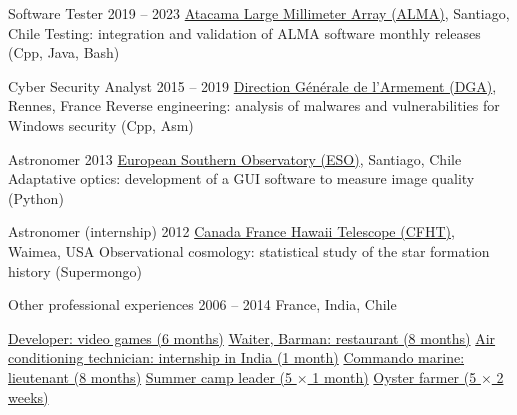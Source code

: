 \begin{joblist}[\tbfwidth][8.4][\tbfyeary]

\setlength{\parskip}{0.3cm}
\vspace{-0.4cm}

\item[Software Tester]{2019 -- 2023}
  {
  \href{https://www.almaobservatory.org}{Atacama Large Millimeter Array (ALMA)}, Santiago, Chile
  }
  {Testing: integration and validation of ALMA software monthly releases (Cpp, Java, Bash)}

\item[Cyber Security Analyst]{2015 -- 2019}
  {
  \href{http://www.defense.gouv.fr/dga/}{Direction Générale de l'Armement (DGA)}, Rennes, France
  }
  {Reverse engineering: analysis of malwares and vulnerabilities for Windows security (Cpp, Asm)}

\item[Astronomer]{2013}
  {
  \href{http://www.eso.org/public/}{European Southern Observatory (ESO)}, Santiago, Chile
  }
  {Adaptative optics: development of a GUI software to measure image quality (Python)}


\item[Astronomer (internship)]{2012}
  {
  \href{https://www.cfht.hawaii.edu/}{Canada France Hawaii Telescope (CFHT)}, Waimea, USA
  }
  {Observational cosmology: statistical study of the star formation history (Supermongo)}


\item[Other professional experiences]{2006 -- 2014}
  {
  France, India, Chile
  }
  {
    \renewcommand\labelitemi{{}}
    \vspace{-0.8cm}
    \setlength{\parskip}{0cm}
    \begin{itemize}[leftmargin=*, label=\textbullet]
    \setlength\itemsep{0cm}


    \cvitem \href{https://tinmarino.github.io}{Developer: video games (6 months)}
    \cvitem \href{http://www.insertcoin.cl/}{Waiter, Barman: restaurant (8 months)}
    \cvitem \href{http://www.dupont.co.in/}{Air conditioning technician: internship in India (1 month)}
    \cvitem \href{http://www.defense.gouv.fr/marine/organisation/forces/fusiliers-marins-et-commandos/force-maritime-des-fusiliers-marins-et-commandos}{Commando marine: lieutenant (8 months)}
    \cvitem \href{http://www.vacances-pour-tous.org/}{Summer camp leader (5 $\times$ 1 month)}
    \cvitem \href{http://huitresdesaintvaast.fr/}{Oyster farmer (5 $\times$ 2 weeks)}



\end{itemize}}
\end{joblist}
